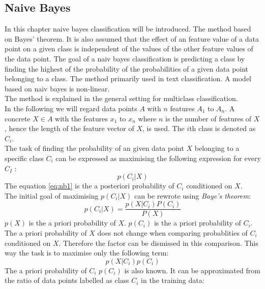 \subsection{Naive Bayes}
In this chapter naive bayes classification will be introduced. The method based on Bayes’ theorem. It is also assumed that the effect of an feature value of a data point on a given class is independent of the values of the other feature values of the data point. The goal of a naiv bayes classification is predicting a class by finding the highest of the probability of the probabilities of a given data point belonging to a class. The method primarily used in text classification.
A model based on naiv bayes is non-linear.
\\
The method is explained in the general setting for multiclass classification.
\\
In the following we will regard data points $A$ with $n$ features $A_1$ to $A_n$. A concrete $X \in A$ with the features $x_1$ to $x_n$ where $n$ is the number of features of $X$, hence the length of the feature vector of $X$, is used. The $i$th class is denoted as $C_i$.\\
The task of finding the probability of an given data point $X$ belonging to a specific class $C_i$ can be expressed as maximising the following expression for every $C_I$ :
\begin{equation} \label{eq:nb1}
 p(C_i|X)
\end{equation}
The equation \ref{eq:nb1} is the a posteriori probability of $C_i$ conditioned on $X$.
\\
The initial goal of maximising $p(C_i|X)$ can be rewrote using \emph{Baye's theorem}:
\begin{equation} \label{eq:nb2}
p(C_i|X)=\frac{p(X|C_i) P(C_i)}{P(X)}
\end{equation}
$p(X)$ is the a priori probability of $X$. $p(C_i)$ is the a priori probability of $C_i$.
\\
The a priori probability of $X$ does not change when comparing probablities of $C_i$ conditioned on $X$. Therefore the factor can be dismissed in this comparison. This way the task is to maximise only the following term:
\begin{equation} \label{eq:nb3}
p(X|C_i) p(C_i)
\end{equation}
The a priori probability of $C_i$  $p(C_i)$ is also known. It can be approximated from the ratio of data points labelled as class $C_i$ in the training data:
